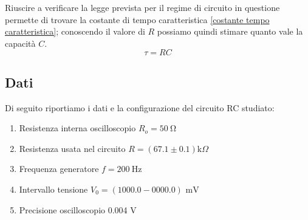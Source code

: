 \documentclass[letterpaper,12pt]{article}
\begin{document}
Riuscire a verificare la legge prevista per il regime di circuito in questione permette di trovare la costante di tempo caratteristica \ref{costante tempo caratteristica}; conoscendo il valore di $R$ possiamo quindi stimare quanto vale la capacità $C$.
\begin{equation}
	\tau = RC
	\label{costante tempo caratteristica}
\end{equation}
\newpage



\subsection{Dati}
Di seguito riportiamo i dati e la configurazione del circuito RC studiato:
\begin{enumerate}[itemsep=1pt]
	\item Resistenza interna oscilloscopio $R_o = \SI{50}{\ohm}$
	\item Resistenza usata nel circuito $R = (67.1\pm0.1) \text{k}\Omega$
	\item Frequenza generatore $f = \SI{200}{\hertz}$
	\item Intervallo tensione $V_0= (1000.0 - 0000.0) \text{ mV}$
	\item Precisione oscilloscopio 0.004 V
\end{enumerate}


\end{document}
